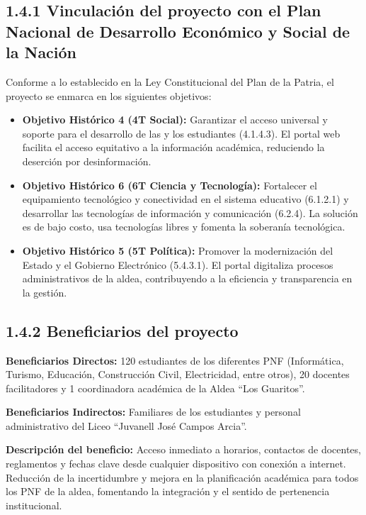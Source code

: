 \documentclass[12pt, letterpaper]{article}
\begin{document}
	\subsection*{1.4.1 Vinculación del proyecto con el Plan Nacional de Desarrollo Económico y Social de la Nación}
	
	Conforme a lo establecido en la Ley Constitucional del Plan de la Patria, el proyecto se enmarca en los siguientes objetivos:
	
	\begin{itemize}
		\item \textbf{Objetivo Histórico 4 (4T Social):} Garantizar el acceso universal y soporte para el desarrollo de las y los estudiantes (4.1.4.3). El portal web facilita el acceso equitativo a la información académica, reduciendo la deserción por desinformación.
		\item \textbf{Objetivo Histórico 6 (6T Ciencia y Tecnología):} Fortalecer el equipamiento tecnológico y conectividad en el sistema educativo (6.1.2.1) y desarrollar las tecnologías de información y comunicación (6.2.4). La solución es de bajo costo, usa tecnologías libres y fomenta la soberanía tecnológica.
		\item \textbf{Objetivo Histórico 5 (5T Política):} Promover la modernización del Estado y el Gobierno Electrónico (5.4.3.1). El portal digitaliza procesos administrativos de la aldea, contribuyendo a la eficiencia y transparencia en la gestión.
	\end{itemize}
	
	\subsection*{1.4.2 Beneficiarios del proyecto}
	
	\textbf{Beneficiarios Directos:} 120 estudiantes de los diferentes PNF (Informática, Turismo, Educación, Construcción Civil, Electricidad, entre otros), 20 docentes facilitadores y 1 coordinadora académica de la Aldea “Los Guaritos”.
	
	\textbf{Beneficiarios Indirectos:} Familiares de los estudiantes y personal administrativo del Liceo “Juvanell José Campos Arcia”.
	
	\textbf{Descripción del beneficio:} Acceso inmediato a horarios, contactos de docentes, reglamentos y fechas clave desde cualquier dispositivo con conexión a internet. Reducción de la incertidumbre y mejora en la planificación académica para todos los PNF de la aldea, fomentando la integración y el sentido de pertenencia institucional.
	
\end{document}
